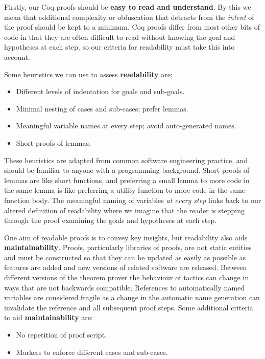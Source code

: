 \documentclass[]{unswthesis}
\let\i\textit
\let\b\textbf
\begin{document}
Firstly, our Coq proofs should be \b{easy to read and understand}. By this we mean that additional complexity or obfuscation that detracts from the \i{intent} of the proof should be kept to a minimum. Coq proofs differ from most other bits of code in that they are often difficult to read without knowing the goal and hypotheses at each step, so our criteria for readability must take this into account.

Some heuristics we can use to assess \b{readability} are:

\begin{itemize}
\item Different levels of indentation for goals and sub-goals.
\item Minimal nesting of cases and sub-cases; prefer lemmas.
\item Meaningful variable names at every step; avoid auto-generated names.
\item Short proofs of lemmas.
\end{itemize}

These heuristics are adapted from common software engineering practice, and should be familiar to anyone with a programming background. Short proofs of lemmas are like short functions, and preferring a small lemma to more code in the same lemma is like preferring a utility function to more code in the same function body. The meaningful naming of variables \i{at every step} links back to our altered definition of readability where we imagine that the reader is stepping through the proof examining the goals and hypotheses at each step.

One aim of readable proofs is to convey key insights, but readability also aids \b{maintainability}. Proofs, particularly libraries of proofs, are not static entities and must be constructed so that they can be updated as easily as possible as features are added and new versions of related software are released. Between different versions of the theorem prover the behaviour of tactics can change in ways that are not backwards compatible. References to automatically named variables are considered fragile as a change in the automatic name generation can invalidate the reference and all subsequent proof steps. Some additional criteria to aid \b{maintainability} are:

\begin{itemize}
\item No repetition of proof script.
\item Markers to enforce different cases and sub-cases.
\end{itemize}
\end{document}
